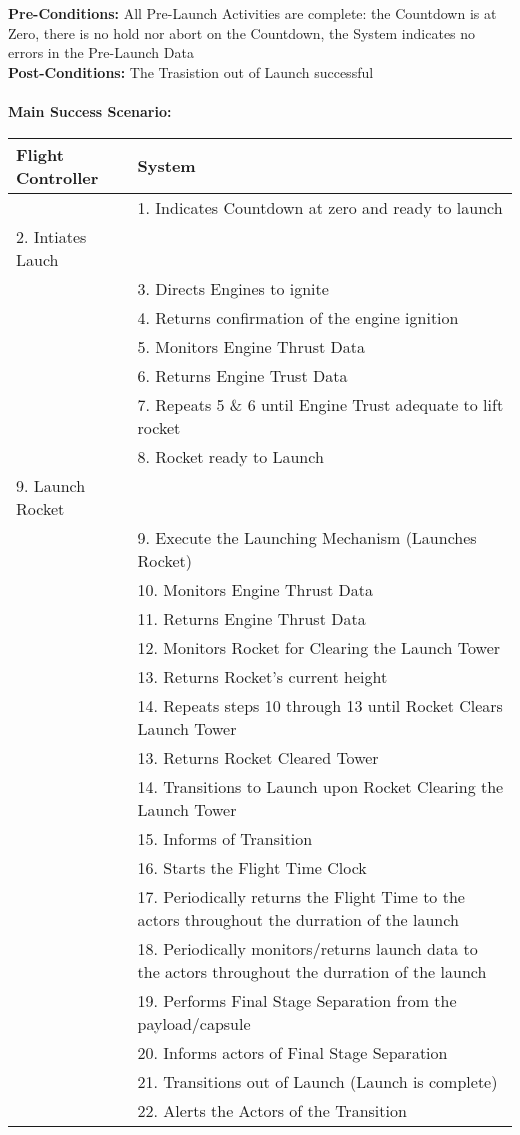 \documentclass[letterpaper]{article}
\begin{document}
\textbf{Pre-Conditions:  }All Pre-Launch Activities are complete:  the
Countdown is at Zero, there is no hold nor abort on the Countdown, the
System indicates no errors in the Pre-Launch Data\\
\textbf{Post-Conditions:  }The Trasistion out of Launch successful\\\\
\textbf{Main Success Scenario:  }\\
\begin{tabular}{|p{5.75cm}|p{5.75cm}|}\hline
\textbf{Flight Controller} & \textbf{System}\\\hline
&1.  Indicates Countdown at zero and ready to launch\\\hline
2. Intiates Lauch & \\\hline
& 3.  Directs Engines to ignite\\\hline
& 4.  Returns confirmation of the engine ignition\\\hline
& 5.  Monitors Engine Thrust Data\\\hline
& 6.  Returns Engine Trust Data\\\hline
& 7.  Repeats 5 \& 6 until Engine Trust adequate to lift
rocket\\\hline
& 8.  Rocket ready to Launch\\\hline
9. Launch Rocket &\\\hline
& 9.   Execute the Launching Mechanism (Launches Rocket)\\\hline
& 10.  Monitors Engine Thrust Data\\\hline
& 11.  Returns Engine Thrust Data\\\hline
& 12.  Monitors Rocket for Clearing the Launch Tower\\\hline
& 13.  Returns Rocket's current height\\\hline
& 14.  Repeats steps 10 through 13 until Rocket Clears Launch
Tower\\\hline
& 13.  Returns Rocket Cleared Tower\\\hline
& 14.  Transitions to Launch upon Rocket Clearing the Launch
Tower\\\hline
& 15.  Informs of Transition\\\hline 
& 16.  Starts the Flight Time Clock\\\hline
& 17.  Periodically returns the Flight Time to the actors
throughout the durration of the launch\\\hline
& 18. Periodically monitors/returns launch data to the actors
throughout the durration of the launch\\\hline
& 19.  Performs Final Stage Separation from the payload/capsule\\\hline
& 20.  Informs actors of Final Stage Separation\\\hline
& 21. Transitions out of Launch (Launch is complete)\\\hline
& 22. Alerts the Actors of the Transition\\\hline
\end{tabular}\\\\
\end{document}
